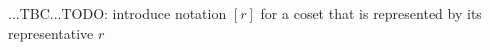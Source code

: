 ...TBC...TODO: introduce notation $[r]$ for a coset that is represented by its representative $r$




%
%
%
%




